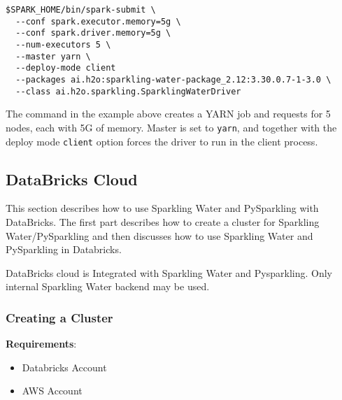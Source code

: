 \begin{lstlisting}[style=Bash]
$SPARK_HOME/bin/spark-submit \ 
  --conf spark.executor.memory=5g \
  --conf spark.driver.memory=5g \
  --num-executors 5 \
  --master yarn \
  --deploy-mode client
  --packages ai.h2o:sparkling-water-package_2.12:3.30.0.7-1-3.0 \
  --class ai.h2o.sparkling.SparklingWaterDriver
\end{lstlisting}

The command in the example above creates a YARN job and requests for 5 nodes, each with 5G of memory. Master
is set to \texttt{yarn}, and together with the deploy mode \texttt{client} option forces the driver to run in the client process.

\subsection{DataBricks Cloud}
This section describes how to use Sparkling Water and PySparkling with DataBricks.
The first part describes how to create a cluster for Sparkling Water/PySparkling and then discusses how to use Sparkling Water and PySparkling in Databricks.


DataBricks cloud is Integrated with Sparkling Water and Pysparkling. Only internal Sparkling Water backend may be used.

\subsubsection{Creating a Cluster}

\textbf{Requirements}:
\begin{itemize}
    \item Databricks Account
    \item AWS Account
\end{itemize}

